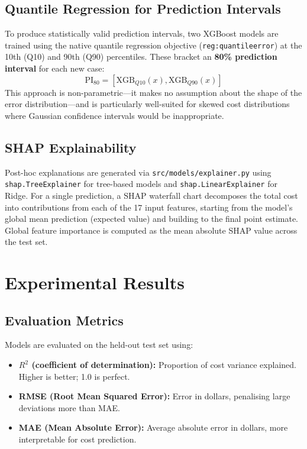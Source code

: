 \documentclass[11pt,a4paper]{article}
\begin{document}
\subsection{Quantile Regression for Prediction Intervals}
To produce statistically valid prediction intervals, two XGBoost models are trained using the native quantile regression objective (\texttt{reg:quantileerror}) at the 10th (Q10) and 90th (Q90) percentiles. These bracket an \textbf{80\% prediction interval} for each new case:
\[
\mathrm{PI}_{80} = [\mathrm{XGB}_{Q10}(x), \mathrm{XGB}_{Q90}(x)]
\]
This approach is non-parametric---it makes no assumption about the shape of the error distribution---and is particularly well-suited for skewed cost distributions where Gaussian confidence intervals would be inappropriate.

\subsection{SHAP Explainability}
Post-hoc explanations are generated via \texttt{src/models/explainer.py} using \texttt{shap.TreeExplainer} for tree-based models and \texttt{shap.LinearExplainer} for Ridge. For a single prediction, a SHAP waterfall chart decomposes the total cost into contributions from each of the 17 input features, starting from the model's global mean prediction (expected value) and building to the final point estimate. Global feature importance is computed as the mean absolute SHAP value across the test set.

\section{Experimental Results}
\subsection{Evaluation Metrics}
Models are evaluated on the held-out test set using:
\begin{itemize}
  \item \textbf{$R^2$ (coefficient of determination):} Proportion of cost variance explained. Higher is better; 1.0 is perfect.
  \item \textbf{RMSE (Root Mean Squared Error):} Error in dollars, penalising large deviations more than MAE.
  \item \textbf{MAE (Mean Absolute Error):} Average absolute error in dollars, more interpretable for cost prediction.
\end{itemize}
\end{document}
